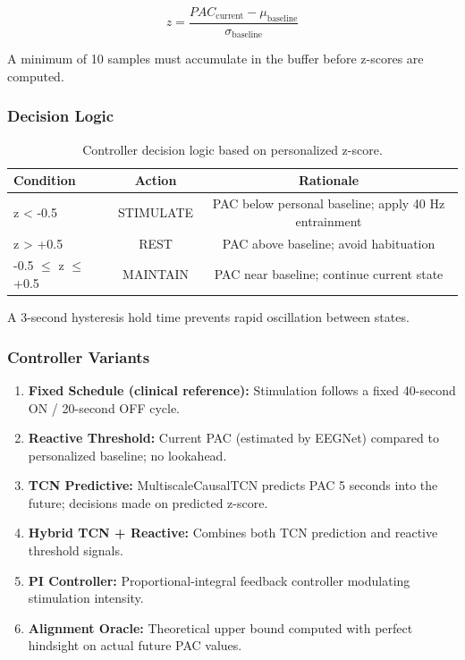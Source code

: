 \documentclass[11pt,letterpaper]{article}
\begin{document}
\begin{equation}
  z = \frac{PAC_{\text{current}} - \mu_{\text{baseline}}}{\sigma_{\text{baseline}}}
\end{equation}

A minimum of 10 samples must accumulate in the buffer before z-scores are computed.

\subsubsection{Decision Logic}

\begin{table}[htbp]
\centering
\caption{Controller decision logic based on personalized z-score.}
\label{tab:decision_logic}
\small
\begin{tabular}{lcc}
\toprule
\textbf{Condition} & \textbf{Action} & \textbf{Rationale} \\
\midrule
z < -0.5 & STIMULATE & PAC below personal baseline; apply 40 Hz entrainment \\
z > +0.5 & REST & PAC above baseline; avoid habituation \\
-0.5 $\leq$ z $\leq$ +0.5 & MAINTAIN & PAC near baseline; continue current state \\
\bottomrule
\end{tabular}
\end{table}

A 3-second hysteresis hold time prevents rapid oscillation between states.

\subsubsection{Controller Variants}

\begin{enumerate}[nosep]
  \item \textbf{Fixed Schedule (clinical reference):} Stimulation follows a fixed 40-second ON / 20-second OFF cycle.
  \item \textbf{Reactive Threshold:} Current PAC (estimated by EEGNet) compared to personalized baseline; no lookahead.
  \item \textbf{TCN Predictive:} MultiscaleCausalTCN predicts PAC 5 seconds into the future; decisions made on predicted z-score.
  \item \textbf{Hybrid TCN + Reactive:} Combines both TCN prediction and reactive threshold signals.
  \item \textbf{PI Controller:} Proportional-integral feedback controller modulating stimulation intensity.
  \item \textbf{Alignment Oracle:} Theoretical upper bound computed with perfect hindsight on actual future PAC values.
\end{enumerate}
\end{document}

